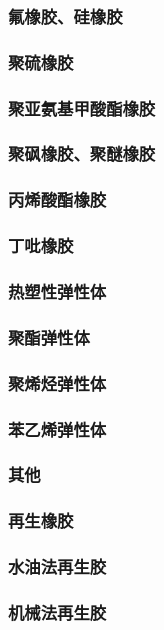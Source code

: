 \documentclass[UTF8]{../../ApplicationUniverse}
\begin{document}
        \subsubsection{氟橡胶、硅橡胶}
        \subsubsection{聚硫橡胶}
        \subsubsection{聚亚氨基甲酸酯橡胶}
        \subsubsection{聚砜橡胶、聚醚橡胶}
        \subsubsection{丙烯酸酯橡胶}
        \subsubsection{丁吡橡胶}
\subsubsection{热塑性弹性体}
    \subsubsection{聚酯弹性体}
    \subsubsection{聚烯烃弹性体}
    \subsubsection{苯乙烯弹性体}
    \subsubsection{其他}
\subsubsection{再生橡胶}
    \subsubsection{水油法再生胶}
    \subsubsection{机械法再生胶}
\end{document}
